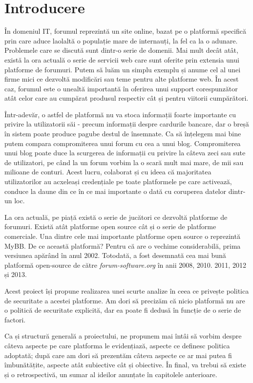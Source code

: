 \chapter{Introducere}

În domeniul IT, forumul reprezintă un site online, bazat pe o platformă specifică prin care aduce laolaltă o populație mare de internauți, la fel ca la o adunare. Problemele care se discută sunt dintr-o serie de domenii. Mai mult decât atât, există la ora actuală o serie de servicii web care sunt oferite prin extensia unui platforme de forumuri. Putem să luăm un simplu exemplu și anume cel al unei firme mici ce dezvoltă modificări sau teme pentru alte platforme web. În acest caz, forumul este o unealtă importantă în oferirea unui support corespunzător atât celor care au cumpărat produsul respectiv cât și pentru viitorii cumpărători.

Într-adevăr, o astfel de platformă nu va stoca informații foarte importante cu privire la utilizatorii săi - precum informații despre cardurile bancare, dar o breșă în sistem poate produce pagube destul de însemnate. Ca să înțelegem mai bine putem compara compromiterea unui forum cu cea a unui blog. Compromiterea unui blog poate duce la scurgerea de informații cu privire la câteva zeci sau sute de utilizatori, pe când la un forum vorbim la o scară mult mai mare, de mii sau milioane de conturi. Acest lucru, colaborat și cu ideea că majoritatea utilizatorilor au acxeleași credențiale pe toate platformele pe care activează, conduce la daune din ce în ce mai importante o dată cu coruperea datelor dintr-un loc.

La ora actuală, pe piață există o serie de jucători ce dezvoltă platforme de forumuri. Există atât platforme open source cât și o serie de platforme comerciale. Una dintre cele mai importante platforme open source o reprezintă MyBB. De ce această platformă? Pentru că are o vechime considerabilă, prima versiunea apărând în anul 2002. Totodată, a fost desemnată cea mai bună platformă open-source de către \textit{forum-software.org} în anii 2008, 2010. 2011, 2012 și 2013.

Acest proiect își propune realizarea unei scurte analize în ceea ce privește politica de securitate a acestei platforme. Am dori să precizăm că nicio platformă nu are o politică de securitate explicită, dar ea poate fi dedusă în funcție de o serie de factori.

Ca și structură generală a proiectului, ne propunem mai întâi să vorbim despre câteva aspecte pe care platforma le evidențiază, aspecte ce definesc politica adoptată; după care am dori să prezentăm câteva aspecte ce ar mai putea fi îmbunătățite, aspecte atât subiective cât și obiective. În final, va trebui să existe și o retrospectivă, un sumar al ideilor anunțate în capitolele anterioare.